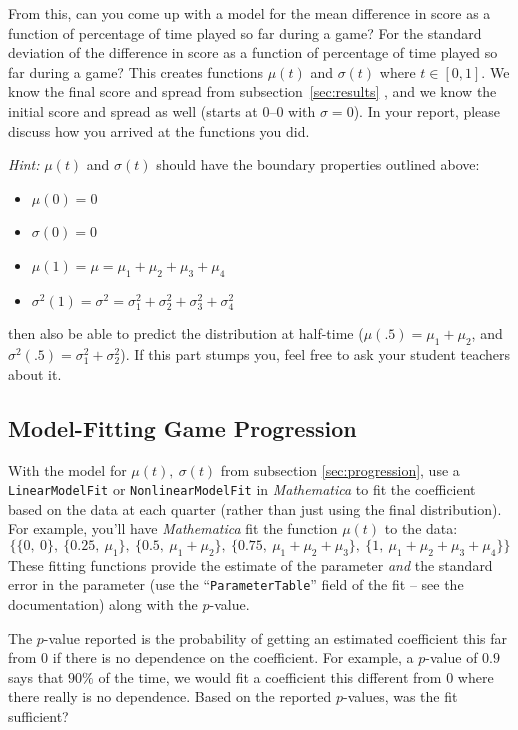 \documentclass{article}
\begin{document}
From this, can you come up with a model for
the mean difference in score as a function of percentage of time played so far during a game? For the standard deviation of the difference in score as a function
of percentage of time played so far during a game? This creates functions $\mu(t)$ and $\sigma(t)$ where $t\in[0,1]$. We know the final score and spread from subsection~\ref{sec:results} ,
and we know the initial score and spread as well (starts at 0--0 with $\sigma=0$). In your report, please discuss how you arrived at the functions you did.

\textit{Hint:} $\mu(t)$ and $\sigma(t)$ should have the boundary properties outlined above: 
\begin{itemize}
\item{$\mu(0)=0$}
\item{$\sigma(0)=0$}
\item{$\mu(1)=\mu=\mu_1+\mu_2+\mu_3+\mu_4$}
\item{$\sigma^2(1)=\sigma^2=\sigma_1^2+\sigma_2^2+\sigma_3^2+\sigma_4^2$}
\end{itemize}
then also be able to predict the distribution at half-time ($\mu(.5)=\mu_1+\mu_2$, and $\sigma^2(.5)=\sigma_1^2+\sigma_2^2$). If this part stumps you, feel free to ask your student teachers about it.

\subsection{Model-Fitting Game Progression}
\label{sec:model}
With the model for $\mu(t),~\sigma(t)$ from subsection \ref{sec:progression}, use a \texttt{LinearModelFit} or \texttt{NonlinearModelFit} in \textit{Mathematica}
to fit the coefficient based on the data at each quarter (rather than just using the final distribution). For example, you'll have \textit{Mathematica} fit the function
$\mu(t)$ to the data:
$$\{\{0,~0\},~\{0.25,~\mu_1\},~\{0.5,~\mu_1+\mu_2\},~\{0.75,~\mu_1+\mu_2+\mu_3\},~\{1,~\mu_1+\mu_2+\mu_3+\mu_4\}\}$$
These fitting functions provide the estimate of the parameter \textit{and} the standard error in the parameter (use the 
``\texttt{ParameterTable}'' field of the fit -- see the documentation) along with the $p$-value. 

The $p$-value reported is the probability of getting an estimated
coefficient this far from $0$ if there is no dependence on the coefficient. For example, a $p$-value of $0.9$ says that $90\%$ of the time, we would fit a coefficient
this different from 0 where there really is no dependence. Based on the reported $p$-values, was the fit sufficient?
\end{document}
